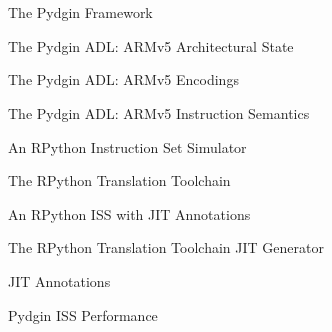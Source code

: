 
\section[{\it Presentation} Pydgin Intro]{}

\begin{frame}{The Pydgin Framework}
\end{frame}

\begin{frame}{The Pydgin ADL: ARMv5 Architectural State}
\end{frame}

\begin{frame}{The Pydgin ADL: ARMv5 Encodings}
\end{frame}

\begin{frame}{The Pydgin ADL: ARMv5 Instruction Semantics}
\end{frame}

\begin{frame}{An RPython Instruction Set Simulator}
\end{frame}

\begin{frame}{The RPython Translation Toolchain}
\end{frame}

\begin{frame}{An RPython ISS with JIT Annotations}
\end{frame}

\begin{frame}{The RPython Translation Toolchain JIT Generator}
\end{frame}

\begin{frame}{JIT Annotations}
\end{frame}

\begin{frame}{Pydgin ISS Performance}
\end{frame}
